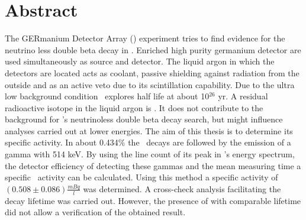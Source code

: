 \documentclass[encoding=utf8,british]{tumphthesis}
\begin{document}



\chapter*{Abstract}
The GERmanium Detector Array (\gerda) experiment tries to find evidence for the neutrino less double beta decay in .
Enriched high purity germanium detector are used simultaneously as source and detector.
The liquid argon in which the detectors are located acts as coolant, passive shielding against radiation from the outside and as an active veto due to its scintillation capability.
Due to the ultra low background condition \gerda\ explores half life at about 10$^{26}$ yr.
A residual radioactive isotope in the liquid argon is .
It does not contribute to the background for \gerda's neutrinoless double beta decay search, but might influence analyses carried out at lower energies.
The aim of this thesis is to determine its specific activity.
In about 0.434$\%$ the \Kr\ decays are followed by the emission of a gamma with 514 keV.
By using the line count of its peak in \gerda's energy spectrum, the detector efficiency of detecting these gammas and the mean measuring time a specific \Kr\ activity can be calculated.
Using this method a specific activity of $(0.508\pm0.086)\frac{\unit{mBq}}{\unit{l}}$ was determined.
A cross-check analysis facilitating the decay lifetime was carried out.
However, the presence of  with comparable lifetime did not allow a verification of the obtained result.
\end{document}
